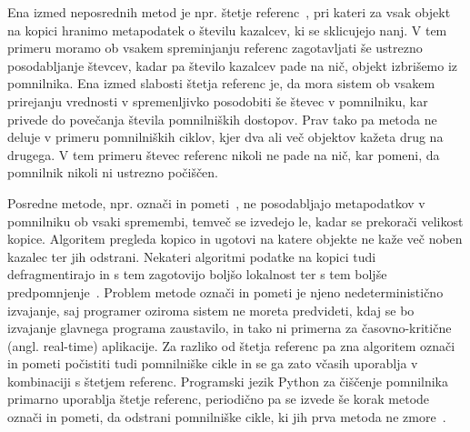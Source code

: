 Ena izmed neposrednih metod je npr. štetje referenc~\cite{collins1960method}, pri kateri za vsak objekt na kopici hranimo metapodatek o številu kazalcev, ki se sklicujejo nanj. V tem primeru moramo ob vsakem spreminjanju referenc zagotavljati še ustrezno posodabljanje števcev, kadar pa število kazalcev pade na nič, objekt izbrišemo iz pomnilnika. Ena izmed slabosti štetja referenc je, da mora sistem ob vsakem prirejanju vrednosti v spremenljivko posodobiti še števec v pomnilniku, kar privede do povečanja števila pomnilniških dostopov. Prav tako pa metoda ne deluje v primeru pomnilniških ciklov, kjer dva ali več objektov kažeta drug na drugega. V tem primeru števec referenc nikoli ne pade na nič, kar pomeni, da pomnilnik nikoli ni ustrezno počiščen.

Posredne metode, npr. označi in pometi~\cite{mccarthy1960recursive}, ne posodabljajo metapodatkov v pomnilniku ob vsaki spremembi, temveč se izvedejo le, kadar se prekorači velikost kopice. Algoritem pregleda kopico in ugotovi na katere objekte ne kaže več noben kazalec ter jih odstrani. Nekateri algoritmi podatke na kopici tudi defragmentirajo in s tem zagotovijo boljšo lokalnost ter s tem boljše predpomnjenje~\cite{fenichel1969lisp}. Problem metode označi in pometi je njeno nedeterministično izvajanje, saj programer oziroma sistem ne moreta predvideti, kdaj se bo izvajanje glavnega programa zaustavilo, in tako ni primerna za časovno-kritične (angl. real-time) aplikacije. Za razliko od štetja referenc pa zna algoritem označi in pometi počistiti tudi pomnilniške cikle in se ga zato včasih uporablja v kombinaciji s štetjem referenc. Programski jezik Python za čiščenje pomnilnika primarno uporablja štetje referenc, periodično pa se izvede še korak metode označi in pometi, da odstrani pomnilniške cikle, ki jih prva metoda ne zmore~\cite{van2007python}.